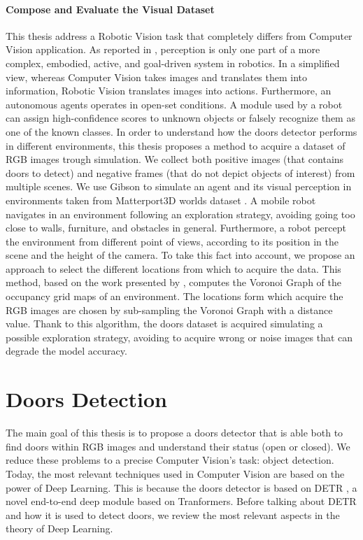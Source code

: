\paragraph{Compose and Evaluate the Visual Dataset}
This thesis address a Robotic Vision task that completely differs from Computer Vision application. As reported in \cite{surveydeeplimits}, perception is only one part of a more complex, embodied, active, and goal-driven system in robotics.
In a simplified view, whereas Computer Vision takes images and translates them into information, Robotic Vision translates images into actions. Furthermore, an autonomous agents operates in open-set conditions. A module used by a robot can assign high-confidence scores to unknown objects or falsely recognize them as one of the known classes. In order to understand how the doors detector performs in different environments, this thesis proposes a method to acquire a dataset of RGB images trough simulation. We collect both positive images (that contains doors to detect) and negative frames (that do not depict objects of interest) from multiple scenes. We use Gibson \cite{gibson} to simulate an agent and its visual perception in environments taken from Matterport3D worlds dataset \cite{matterport}. A mobile robot navigates in an environment following an exploration strategy, avoiding going too close to walls, furniture, and obstacles in general. Furthermore, a robot percept the environment from different point of views, according to its position in the scene and the height of the camera. To take this fact into account, we propose an approach to select the different locations from which to acquire the data. This method, based on the work presented by \citeauthor{segmentationsurvey} \cite{segmentationsurvey}, computes the Voronoi Graph of the occupancy grid maps of an environment. The locations form which acquire the RGB images are chosen by sub-sampling the Voronoi Graph with a distance value. Thank to this algorithm, the doors dataset is acquired simulating a possible exploration strategy, avoiding to acquire wrong or noise images that can degrade the model accuracy.


\section{Doors Detection}

The main goal of this thesis is to propose a doors detector that is able both to find doors within RGB images and understand their status (open or closed). We reduce these problems to a precise Computer Vision's task: object detection. Today, the most relevant techniques used in Computer Vision are based on the power of Deep Learning. This is because the doors detector is based on DETR \cite{detr}, a novel end-to-end deep module based on Tranformers. Before talking about DETR and how it is used to detect doors, we review the most relevant aspects in the theory of Deep Learning.

